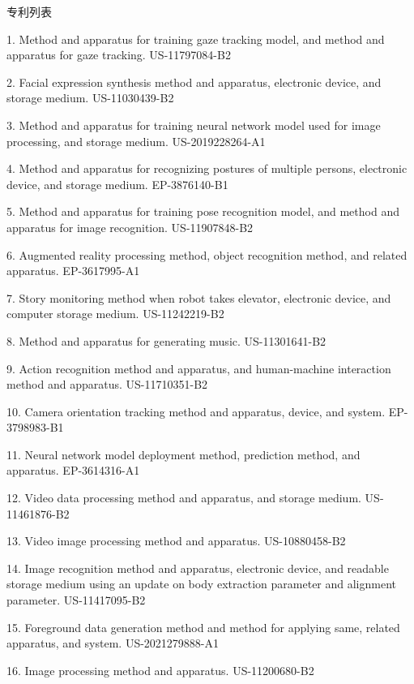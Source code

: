 \documentclass[UTF8]{cv_professional-cn} %
\makeatletter
\newlength{\bibhang}
\newlength{\bibsep}
 {\@listi \global\bibsep\itemsep \global\advance\bibsep by\parsep}
\newenvironment{bibsection}%
        {\vspace{\itemsep}\begin{list}{}{%
       \setlength{\leftmargin}{\bibhang}%
       \setlength{\itemsep}{\bibsep}%
       \setlength{\parsep}{\z@}%
        \setlength{\partopsep}{0pt}%
        \setlength{\topsep}{0pt}}}
        {\end{list}\vspace{\itemsep}}
\makeatother
\begin{document}
\begin{rSection}{专利列表}

\begin{bibsection}
  \item[1.] Method and apparatus for training gaze tracking model, and method and apparatus for gaze tracking. US-11797084-B2
  \item[2.] Facial expression synthesis method and apparatus, electronic device, and storage medium. US-11030439-B2
  \item[3.] Method and apparatus for training neural network model used for image processing, and storage medium. US-2019228264-A1
  \item[4.] Method and apparatus for recognizing postures of multiple persons, electronic device, and storage medium. EP-3876140-B1
  \item[5.] Method and apparatus for training pose recognition model, and method and apparatus for image recognition. US-11907848-B2
  \item[6.] Augmented reality processing method, object recognition method, and related apparatus. EP-3617995-A1
  \item[7.] Story monitoring method when robot takes elevator, electronic device, and computer storage medium. US-11242219-B2
  \item[8.] Method and apparatus for generating music. US-11301641-B2
  \item[9.] Action recognition method and apparatus, and human-machine interaction method and apparatus. US-11710351-B2
  \item[10.] Camera orientation tracking method and apparatus, device, and system. EP-3798983-B1
  \item[11.] Neural network model deployment method, prediction method, and apparatus. EP-3614316-A1
  \item[12.] Video data processing method and apparatus, and storage medium. US-11461876-B2
  \item[13.] Video image processing method and apparatus. US-10880458-B2
  \item[14.] Image recognition method and apparatus, electronic device, and readable storage medium using an update on body extraction parameter and alignment parameter. US-11417095-B2
  \item[15.] Foreground data generation method and method for applying same, related apparatus, and system. US-2021279888-A1
  \item[16.] Image processing method and apparatus. US-11200680-B2

\end{bibsection}
\end{rSection}
\end{document}
